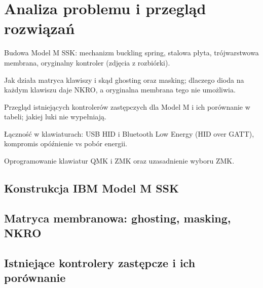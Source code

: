 \chapter{Analiza problemu i przegląd rozwiązań}\label{ch:analiza}
\begin{zawartosc}
  \item Budowa Model M SSK: mechanizm buckling spring, stalowa płyta, trójwarstwowa membrana, oryginalny kontroler (zdjęcia z rozbiórki).
  \item Jak działa matryca klawiszy i skąd ghosting oraz masking; dlaczego dioda na każdym klawiszu daje NKRO, a oryginalna membrana tego nie umożliwia.
  \item Przegląd istniejących kontrolerów zastępczych dla Model M i ich porównanie w tabeli; jakiej luki nie wypełniają.
  \item Łączność w klawiaturach: USB HID i Bluetooth Low Energy (HID over GATT), kompromis opóźnienie vs pobór energii.
  \item Oprogramowanie klawiatur QMK i ZMK oraz uzasadnienie wyboru ZMK.
\end{zawartosc}

\section{Konstrukcja IBM Model M SSK}\label{sec:modelm}

\section{Matryca membranowa: ghosting, masking, NKRO}\label{sec:matryca}

\section{Istniejące kontrolery zastępcze i ich porównanie}\label{sec:kontrolery}

